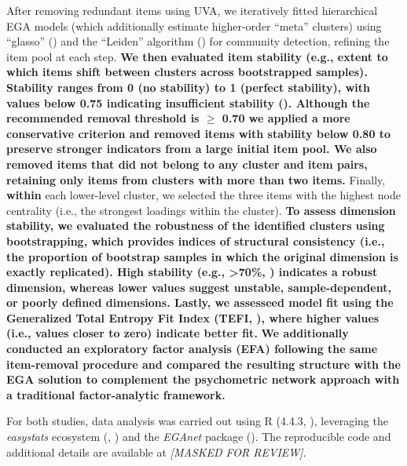 \documentclass[
  man,
  floatsintext,
  longtable,
  nolmodern,
  notxfonts,
  notimes,
  mask,
  colorlinks=true,linkcolor=blue,citecolor=blue,urlcolor=blue]{apa7}
\begin{document}
After removing redundant items using UVA, we iteratively fitted
hierarchical EGA models (which additionally estimate higher-order
``meta'' clusters) using ``glasso''
() and the
``Leiden'' algorithm () for community detection, refining the item pool at each step.
\textbf{We then evaluated item stability (e.g., extent to which items
shift between clusters across bootstrapped samples). Stability ranges
from 0 (no stability) to 1 (perfect stability), with values below 0.75
indicating insufficient stability
(). Although the recommended removal threshold is \(\ge\) 0.70 we
applied a more conservative criterion and removed items with stability
below 0.80 to preserve stronger indicators from a large initial item
pool. We also removed items that did not belong to any cluster and item
pairs, retaining only items from clusters with more than two items.}
Finally, \textbf{within} each lower-level cluster, we selected the three
items with the highest node centrality (i.e., the strongest loadings
within the cluster). \textbf{To assess dimension stability, we evaluated
the robustness of the identified clusters using bootstrapping, which
provides indices of structural consistency (i.e., the proportion of
bootstrap samples in which the original dimension is exactly
replicated). High stability (e.g., \textgreater70\%,
)
indicates a robust dimension, whereas lower values suggest unstable,
sample-dependent, or poorly defined dimensions. Lastly, we assesseed
model fit using the Generalized Total Entropy Fit Index (TEFI,
), where higher
values (i.e., values closer to zero) indicate better fit.} \textbf{We
additionally conducted an exploratory factor analysis (EFA) following
the same item-removal procedure and compared the resulting structure
with the EGA solution to complement the psychometric network approach
with a traditional factor-analytic framework.}

For both studies, data analysis was carried out using R (4.4.3,
), leveraging the
\emph{easystats} ecosystem (, ) and the
\emph{EGAnet} package
(). The reproducible code and additional details are available at
\emph{{[}MASKED FOR REVIEW{]}}.
\end{document}
